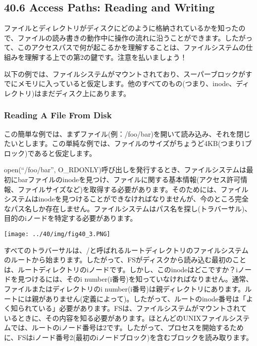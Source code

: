 \hypertarget{access-paths-reading-and-writing}{%
\subsection*{40.6 Access Paths: Reading and
Writing}\label{access-paths-reading-and-writing}}

ファイルとディレクトリがディスクにどのように格納されているかを知ったので、ファイルの読み書きの動作中に操作の流れに沿うことができます。したがって、このアクセスパスで何が起こるかを理解することは、ファイルシステムの仕組みを理解する上での第2の鍵です。注意を払いましょう！

以下の例では、ファイルシステムがマウントされており、スーパーブロックがすでにメモリに入っていると仮定します。他のすべてのもの(つまり、inode、ディレクトリ)はまだディスク上にあります。

\hypertarget{reading-a-file-from-disk}{%
\subsubsection*{Reading A File From
Disk}\label{reading-a-file-from-disk}}

この簡単な例では、まずファイル(例：/foo/bar)を開いて読み込み、それを閉じたいとします。この単純な例では、ファイルのサイズがちょうど4KB(つまり1ブロック)であると仮定します。

open(``/foo/bar'',
O\_RDONLY)呼び出しを発行するとき、ファイルシステムは最初にbarファイルのinodeを見つけ、ファイルに関する基本情報(アクセス許可情報、ファイルサイズなど)を取得する必要があります。そのためには、ファイルシステムはinodeを見つけることができなければなりませんが、今のところ完全なパス名しか存在しません。ファイルシステムはパス名を探し(トラバーサル)、目的のiノードを特定する必要があります。

\texttt{[image: ../40/img/fig40\_3.PNG]}

すべてのトラバーサルは、/と呼ばれるルートディレクトリのファイルシステムのルートから始まります。したがって、FSがディスクから読み込む最初のことは、ルートディレクトリのiノードです。しかし、このinodeはどこですか？iノードを見つけるには、そのi
number(i番号)を知っていなければなりません。通常、ファイルまたはディレクトリのi
number(i番号)は親ディレクトリにあります。ルートには親がありません(定義によって)。したがって、ルートのinode番号は「よく知られている」必要があります。FSは、ファイルシステムがマウントされているときに、その内容を知る必要があります。ほとんどのUNIXファイルシステムでは、ルートのiノード番号は2です。したがって、プロセスを開始するために、FSはiノード番号2(最初のiノードブロック)を含むブロックを読み取ります。

